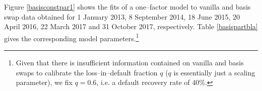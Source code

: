 \documentclass[12pt,a4paper]{article}
\theoremstyle{plain}
\numberwithin{equation}{section}
\begin{document}
Figure \ref{basisconstpar1} shows the fits of a one--factor model to vanilla and basis swap data obtained for 1 January 2013, 8 September 2014, 18 June 2015, 20 April 2016, 22 March 2017 and 31 October 2017, respectively. Table \ref{basispartbla} gives the corresponding model parameters.\footnote{Given that there is insufficient information contained on vanilla and basis swaps to calibrate the loss--in--default fraction $q$ ($q$ is essentially just a scaling parameter), we fix $q=0.6$, i.e. a default recovery rate of 40\%.}
\end{document}
